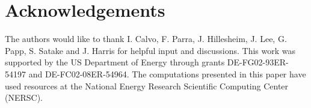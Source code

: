 \documentclass[aip, pop, preprint]{revtex4-1}
\numberwithin{figure}{section}
\numberwithin{equation}{section}
\begin{document}
\FloatBarrier

\section*{Acknowledgements}
The authors would like to thank I. Calvo, F. Parra, J. Hillesheim, J. Lee, G. Papp, S. Satake and J. Harris for helpful input and discussions. This work was supported by the US Department of Energy through grants DE-FG02-93ER-54197 and DE-FC02-08ER-54964. The computations presented in this paper have used resources at the National Energy Research Scientific Computing Center (NERSC). 


\end{document}
